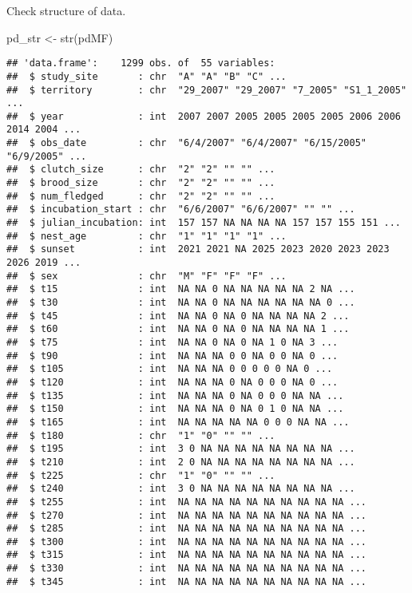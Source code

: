 \documentclass[
]{article}
\newenvironment{Shaded}{\begin{snugshade}}{\end{snugshade}}
\newcommand{\FunctionTok}[1]{\textcolor[rgb]{0.00,0.00,0.00}{#1}}
\newcommand{\NormalTok}[1]{#1}
\newcommand{\OtherTok}[1]{\textcolor[rgb]{0.56,0.35,0.01}{#1}}
\begin{document}
Check structure of data.

\begin{Shaded}
\begin{Highlighting}[]
\NormalTok{pd\_str }\OtherTok{\textless{}{-}} \FunctionTok{str}\NormalTok{(pdMF)}
\end{Highlighting}
\end{Shaded}

\begin{verbatim}
## 'data.frame':    1299 obs. of  55 variables:
##  $ study_site       : chr  "A" "A" "B" "C" ...
##  $ territory        : chr  "29_2007" "29_2007" "7_2005" "S1_1_2005" ...
##  $ year             : int  2007 2007 2005 2005 2005 2005 2006 2006 2014 2004 ...
##  $ obs_date         : chr  "6/4/2007" "6/4/2007" "6/15/2005" "6/9/2005" ...
##  $ clutch_size      : chr  "2" "2" "" "" ...
##  $ brood_size       : chr  "2" "2" "" "" ...
##  $ num_fledged      : chr  "2" "2" "" "" ...
##  $ incubation_start : chr  "6/6/2007" "6/6/2007" "" "" ...
##  $ julian_incubation: int  157 157 NA NA NA NA 157 157 155 151 ...
##  $ nest_age         : chr  "1" "1" "1" "1" ...
##  $ sunset           : int  2021 2021 NA 2025 2023 2020 2023 2023 2026 2019 ...
##  $ sex              : chr  "M" "F" "F" "F" ...
##  $ t15              : int  NA NA 0 NA NA NA NA NA 2 NA ...
##  $ t30              : int  NA NA 0 NA NA NA NA NA NA 0 ...
##  $ t45              : int  NA NA 0 NA 0 NA NA NA NA 2 ...
##  $ t60              : int  NA NA 0 NA 0 NA NA NA NA 1 ...
##  $ t75              : int  NA NA 0 NA 0 NA 1 0 NA 3 ...
##  $ t90              : int  NA NA NA 0 0 NA 0 0 NA 0 ...
##  $ t105             : int  NA NA NA 0 0 0 0 0 NA 0 ...
##  $ t120             : int  NA NA NA 0 NA 0 0 0 NA 0 ...
##  $ t135             : int  NA NA NA 0 NA 0 0 0 NA NA ...
##  $ t150             : int  NA NA NA 0 NA 0 1 0 NA NA ...
##  $ t165             : int  NA NA NA NA NA 0 0 0 NA NA ...
##  $ t180             : chr  "1" "0" "" "" ...
##  $ t195             : int  3 0 NA NA NA NA NA NA NA NA ...
##  $ t210             : int  2 0 NA NA NA NA NA NA NA NA ...
##  $ t225             : chr  "1" "0" "" "" ...
##  $ t240             : int  3 0 NA NA NA NA NA NA NA NA ...
##  $ t255             : int  NA NA NA NA NA NA NA NA NA NA ...
##  $ t270             : int  NA NA NA NA NA NA NA NA NA NA ...
##  $ t285             : int  NA NA NA NA NA NA NA NA NA NA ...
##  $ t300             : int  NA NA NA NA NA NA NA NA NA NA ...
##  $ t315             : int  NA NA NA NA NA NA NA NA NA NA ...
##  $ t330             : int  NA NA NA NA NA NA NA NA NA NA ...
##  $ t345             : int  NA NA NA NA NA NA NA NA NA NA ...

\end{verbatim}
\end{document}
